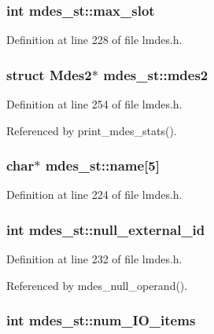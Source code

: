 \subsubsection{\setlength{\rightskip}{0pt plus 5cm}int \bf{mdes\_\-st::max\_\-slot}}\label{structmdes__st_765cd60f19962a53e13c5cec60caeb34}




Definition at line 228 of file lmdes.h.
\subsubsection{\setlength{\rightskip}{0pt plus 5cm}struct \bf{Mdes2}$\ast$ \bf{mdes\_\-st::mdes2}}\label{structmdes__st_621c27e7a2b2759610921b298b6d24ce}




Definition at line 254 of file lmdes.h.

Referenced by print\_\-mdes\_\-stats().
\subsubsection{\setlength{\rightskip}{0pt plus 5cm}char$\ast$ \bf{mdes\_\-st::name}[5]}\label{structmdes__st_7e4ee12b576ec4bbf87cd5b1766f6058}




Definition at line 224 of file lmdes.h.
\subsubsection{\setlength{\rightskip}{0pt plus 5cm}int \bf{mdes\_\-st::null\_\-external\_\-id}}\label{structmdes__st_0d51ee331fc7f4a2105fbcc399170851}




Definition at line 232 of file lmdes.h.

Referenced by mdes\_\-null\_\-operand().
\subsubsection{\setlength{\rightskip}{0pt plus 5cm}int \bf{mdes\_\-st::num\_\-IO\_\-items}}\label{structmdes__st_ae62c2738222d4114a58f074e9b7f5ba}




